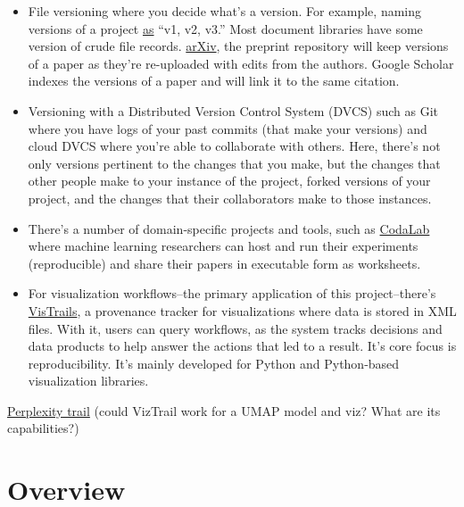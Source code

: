 \documentclass[
]{article}
\providecommand{\tightlist}{%
  \setlength{\itemsep}{0pt}\setlength{\parskip}{0pt}}\usepackage{longtable,booktabs,array}
\begin{document}
\begin{itemize}
\tightlist
\item
  File versioning where you decide what's a version. For example, naming
  versions of a project
  \href{https://researchdata.wisc.edu/news/version-control-for-research-projects/}{as}
  ``v1, v2, v3.'' Most document libraries have some version of crude
  file records. \href{https://arxiv.org/}{arXiv}, the preprint
  repository will keep versions of a paper as they're re-uploaded with
  edits from the authors. Google Scholar indexes the versions of a paper
  and will link it to the same citation.
\item
  Versioning with a Distributed Version Control System (DVCS) such as
  Git where you have logs of your past commits (that make your versions)
  and cloud DVCS where you're able to collaborate with others. Here,
  there's not only versions pertinent to the changes that you make, but
  the changes that other people make to your instance of the project,
  forked versions of your project, and the changes that their
  collaborators make to those instances.
\item
  There's a number of domain-specific projects and tools, such as
  \href{https://codalab.org/}{CodaLab} where machine learning
  researchers can host and run their experiments (reproducible) and
  share their papers in executable form as worksheets.
\item
  For visualization workflows--the primary application of this
  project--there's
  \href{https://www.vistrails.org//index.php/Main_Page}{VisTrails}, a
  provenance tracker for visualizations where data is stored in XML
  files. With it, users can query workflows, as the system tracks
  decisions and data products to help answer the actions that led to a
  result. It's core focus is reproducibility. It's mainly developed for
  Python and Python-based visualization libraries.
\end{itemize}

\href{https://www.perplexity.ai/search/overview-of-viztrails-fCsottRfQR6P0aoMyMLVZg}{Perplexity
trail} (could VizTrail work for a UMAP model and viz? What are its
capabilities?)

\section{Overview}\label{overview}
\end{document}
